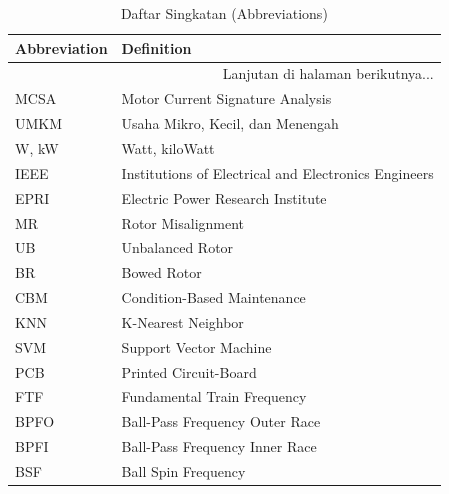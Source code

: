 \documentclass{elsinta}
\begin{document}
\begin{longtable}{|p{4cm}|p{11cm}|} %
    \caption{Daftar Singkatan (Abbreviations)} 
    \label{tab:abbreviationsEL1} \\
    \hline
    \textbf{Abbreviation} & \textbf{Definition} \\
    \hline
    \endhead %
    
    \hline 
    \multicolumn{2}{|r|}{Lanjutan di halaman berikutnya...} \\ 
    \endfoot %
    
    \hline
    \endlastfoot %

    MCSA    & Motor Current Signature Analysis  \\  \hline
    UMKM    & Usaha Mikro, Kecil, dan Menengah  \\  \hline
    W, kW   & Watt, kiloWatt                    \\  \hline
    IEEE    & Institutions of Electrical and Electronics Engineers  \\  \hline
    EPRI    & Electric Power Research Institute \\  \hline
    MR      & Rotor Misalignment                \\  \hline
    UB      & Unbalanced Rotor                  \\  \hline
    BR      & Bowed Rotor                       \\  \hline
    CBM     & Condition-Based Maintenance       \\  \hline
    KNN     & K-Nearest Neighbor                \\  \hline
    SVM     & Support Vector Machine            \\  \hline
    PCB     & Printed Circuit-Board             \\  \hline
    FTF     & Fundamental Train Frequency       \\  \hline
    BPFO    & Ball-Pass Frequency Outer Race    \\  \hline
    BPFI    & Ball-Pass Frequency Inner Race    \\  \hline
    BSF     & Ball Spin Frequency               \\  \hline



\end{longtable}

\end{document}
